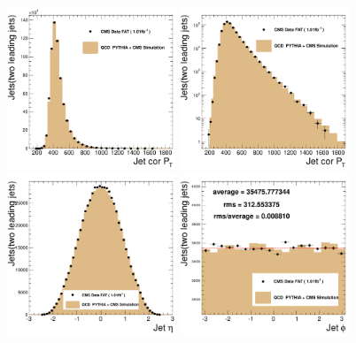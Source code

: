 \begin{figure}[!ht]
  \begin{center}
    \includegraphics[width=0.45\textwidth]{Figures/c_corPt_fat.pdf}
    \includegraphics[width=0.45\textwidth]{Figures/c_corPt_fat_log.pdf}
    \includegraphics[width=0.45\textwidth]{Figures/c_Eta_fat.pdf}
    \includegraphics[width=0.45\textwidth]{Figures/c_Phi_fat.pdf}

\end{center}
\end{figure}
